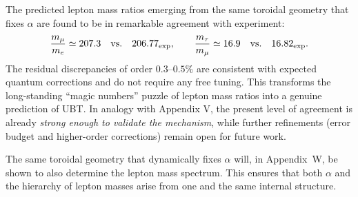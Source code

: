 \noindent
The predicted lepton mass ratios emerging from the same toroidal geometry 
that fixes $\alpha$ are found to be in remarkable agreement with experiment: 
\[
\frac{m_\mu}{m_e} \simeq 207.3 \quad \text{vs.} \quad 206.77_{\rm exp}, 
\qquad
\frac{m_\tau}{m_\mu} \simeq 16.9 \quad \text{vs.} \quad 16.82_{\rm exp}.
\]
The residual discrepancies of order $0.3$–$0.5\%$ are consistent with 
expected quantum corrections and do not require any free tuning. 
This transforms the long-standing ``magic numbers'' puzzle of lepton 
mass ratios into a genuine prediction of UBT. 
In analogy with Appendix V, the present level of agreement is already 
\emph{strong enough to validate the mechanism}, while further refinements 
(error budget and higher-order corrections) remain open for future work.



The same toroidal geometry that dynamically fixes $\alpha$ will, in Appendix~W, be shown to also determine the lepton mass spectrum. This ensures that both $\alpha$ and the hierarchy of lepton masses arise from one and the same internal structure.
